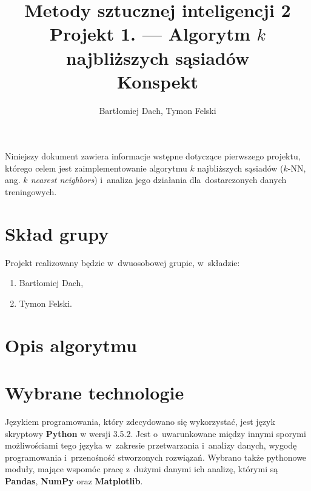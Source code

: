 \documentclass[12pt,a4paper]{article}
\begin{document}
\title{Metody sztucznej inteligencji 2 \\
\Large{
    Projekt 1. --- Algorytm $k$ najbliższych sąsiadów \\
    Konspekt
}}
\author{Bartłomiej Dach, Tymon Felski}
\maketitle

\noindent
Niniejszy dokument zawiera informacje wstępne dotyczące pierwszego projektu, którego celem jest zaimplementowanie algorytmu $k$ najbliższych sąsiadów ($k$-NN, ang. \emph{$k$ nearest neighbors}) i~analiza jego działania dla~dostarczonych danych treningowych.

\section{Skład grupy}

Projekt realizowany będzie w~dwuosobowej grupie, w~składzie:

\begin{enumerate}
    \item Bartłomiej Dach,
    \item Tymon Felski.
\end{enumerate}

\section{Opis algorytmu}

\section{Wybrane technologie}
Językiem programowania, który zdecydowano się wykorzystać, jest język skryptowy \textbf{Python} w wersji 3.5.2. Jest o~uwarunkowane między innymi sporymi możliwościami tego języka w~zakresie przetwarzania i~analizy danych, wygodę programowania i~przenośność stworzonych rozwiązań. Wybrano także pythonowe moduły, mające wspomóc pracę z~dużymi danymi ich analizę, którymi są \textbf{Pandas}, \textbf{NumPy} oraz \textbf{Matplotlib}.\\
\end{document}
